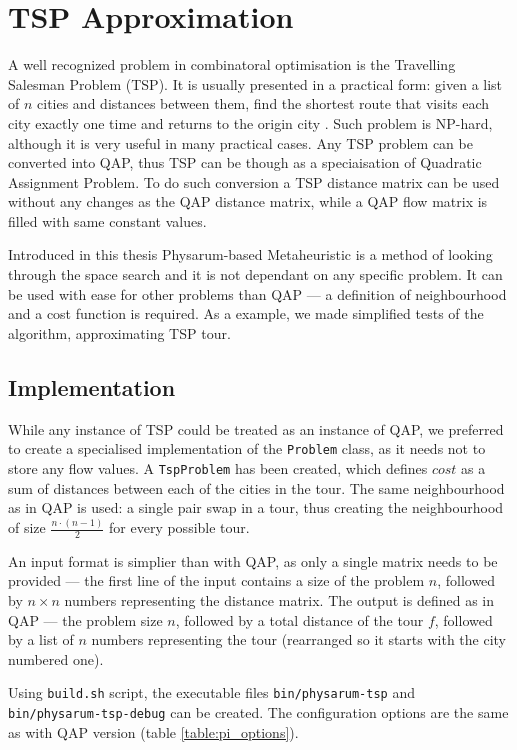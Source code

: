 \chapter{TSP Approximation}
\label{chapter:tsp}

A well recognized problem in combinatoral optimisation is the Travelling Salesman Problem (TSP). It is usually presented in a practical form: given a list of $n$ cities and distances between them, find the shortest route that visits each city exactly one time and returns to the origin city \cite{kruskal1956shortest}. Such problem is NP-hard, although it is very useful in many practical cases. Any TSP problem can be converted into QAP, thus TSP can be though as a speciaisation of Quadratic Assignment Problem. To do such conversion a TSP distance matrix can be used without any changes as the QAP distance matrix, while a QAP flow matrix is filled with same constant values.

Introduced in this thesis Physarum-based Metaheuristic is a method of looking through the space search and it is not dependant on any specific problem. It can be used with ease for other problems than QAP --- a definition of neighbourhood and a cost function is required. As a example, we made simplified tests of the algorithm, approximating TSP tour.


\section*{Implementation}

While any instance of TSP could be treated as an instance of QAP, we preferred to create a specialised implementation of the \texttt{Problem} class, as it needs not to store any flow values. A \texttt{TspProblem} has been created, which defines $cost$ as a sum of distances between each of the cities in the tour. The same neighbourhood as in QAP is used: a single pair swap in a tour, thus creating the neighbourhood of size $\frac{n\cdot(n-1)}{2}$ for every possible tour.

An input format is simplier than with QAP, as only a single matrix needs to be provided --- the first line of the input contains a size of the problem $n$, followed by $n{\times}n$ numbers representing the distance matrix. The output is defined as in QAP --- the problem size $n$, followed by a total distance of the tour $f$, followed by a list of $n$ numbers representing the tour (rearranged so it starts with the city numbered one).

Using \texttt{build.sh} script, the executable files \texttt{bin/physarum-tsp} and \texttt{bin/physarum-tsp-debug} can be created. The configuration options are the same as with QAP version (table \ref{table:pi_options}).


